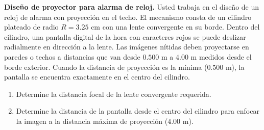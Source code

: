 \item \textbf{Diseño de proyector para alarma de reloj.}
Usted trabaja en el diseño de un reloj de alarma con proyección en el techo. El mecanismo consta de un cilindro plateado de radio $R = 3.25\text{ cm}$ con una lente convergente en su borde. Dentro del cilindro, una pantalla digital de la hora con caracteres rojos se puede deslizar radialmente en dirección a la lente. Las imágenes nítidas deben proyectarse en paredes o techos a distancias que van desde $0.500\text{ m}$ a $4.00\text{ m}$ medidos desde el borde exterior. Cuando la distancia de proyección es la mínima ($0.500\text{ m}$), la pantalla se encuentra exactamente en el centro del cilindro.
\begin{enumerate}
    \item Determine la distancia focal de la lente convergente requerida.
    \item Determine la distancia de la pantalla desde el centro del cilindro para enfocar la imagen a la distancia máxima de proyección ($4.00\text{ m}$).
\end{enumerate}